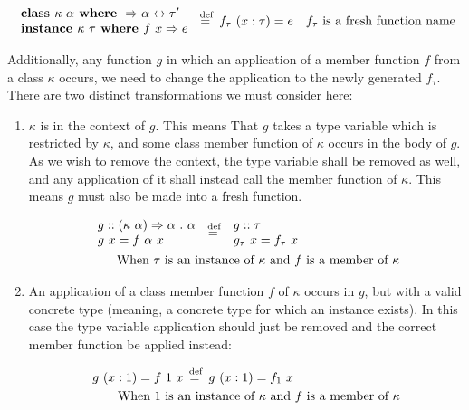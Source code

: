 \begin{align*}
  &\begin{array}{l}
    \textbf{class } \kappa~\alpha \textbf{ where } \Rightarrow \alpha \leftrightarrow \tau' \\
    \textbf{instance } \kappa~\tau \textbf{ where } f~x \Rightarrow e
  \end{array} \stackrel{\>\text{def}}{=}\>
  f_\tau~(x:\tau) = e &
  \text{$f_\tau$ is a fresh function name}
\end{align*}

Additionally, any function $g$ in which an application of a member function $f$
from a class $\kappa$ occurs, we need to change the application to the newly
generated $f_\tau$. There are two distinct transformations we must consider here:

\begin{enumerate}

  \item $\kappa$ is in the context of $g$. This means That $g$ takes a type
    variable which is restricted by $\kappa$, and some class member function of
    $\kappa$ occurs in the body of $g$. As we wish to remove the context, the
    type variable shall be removed as well, and any application of it shall
    instead call the member function of $\kappa$. This means $g$ must also be
    made into a fresh function.

    \begin{align*}
      &\begin{array}{l}
        g :: (\kappa~\alpha) \Rightarrow \alpha~.~\alpha \\
        g~x = f~\alpha~x
      \end{array}
      \stackrel{\>\text{def}}{=}\>
      \begin{array}{l}
        g :: \tau \\
        g_\tau~x = f_\tau~x
      \end{array} \\
      &\qquad\text{When $\tau$ is an instance of $\kappa$ and $f$ is a member of $\kappa$}
    \end{align*}

  \item An application of a class member function $f$ of $\kappa$ occurs in
    $g$, but with a valid concrete type (meaning, a concrete type for which an
    instance exists). In this case the type variable application should just be
    removed and the correct member function be applied instead:

    \begin{align*}
      &g~(x:1) = f~1~x \stackrel{\>\text{def}}{=}\> g~(x:1) = f_1~x \\
      &\qquad\text{When $1$ is an instance of $\kappa$ and $f$ is a member of $\kappa$}
    \end{align*}

\end{enumerate}

